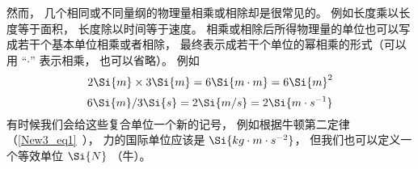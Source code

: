 然而， 几个相同或不同量纲的物理量相乘或相除却是很常见的。 例如长度乘以长度等于面积， 长度除以时间等于速度。 相乘或相除后所得物理量的单位也可以写成若干个基本单位相乘或者相除， 最终表示成若干个单位的幂相乘的形式（可以用 “$\cdot$” 表示相乘， 也可以省略）。 例如
\begin{equation}
2\Si{m} \times 3\Si{m} = 6\Si{m\cdot m} = 6\Si{m}^2
\end{equation}
\begin{equation}
6\Si{m} / 3\Si{s} = 2 \Si{m/s} = 2 \Si{m \cdot s^{-1}}
\end{equation}
有时候我们会给这些复合单位一个新的记号， 例如根据牛顿第二定律（\autoref{New3_eq1}~）， 力的国际单位应该是 $\Si{kg\cdot m\cdot s^{-2}}$， 但我们也可以定义一个等效单位 $\Si{N}$ （牛）。



